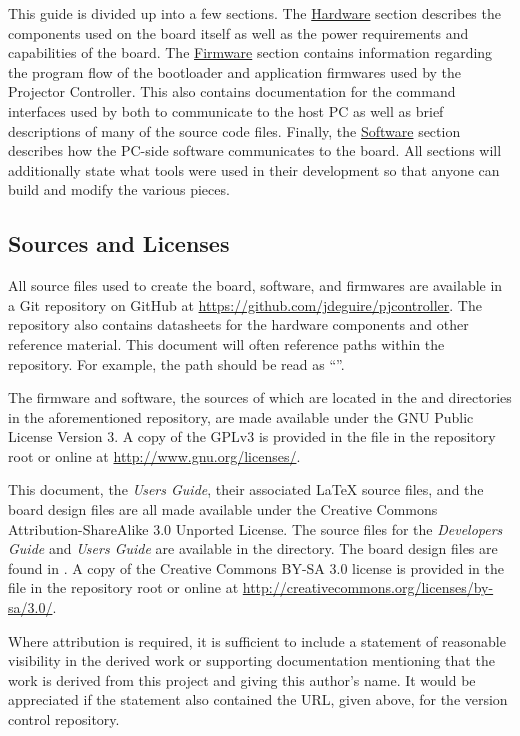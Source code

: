 \documentclass{article}
\begin{document}
This guide is divided up into a few sections.  The \hyperref[sec:Hardware]{Hardware} section
describes the components used on the board itself as well as the power requirements and capabilities
of the board.  The \hyperref[sec:Firmware]{Firmware} section contains information regarding the
program flow of the bootloader and application firmwares used by the Projector Controller.  This
also contains documentation for the command interfaces used by both to communicate to the host PC as
well as brief descriptions of many of the source code files.  Finally, the
\hyperref[sec:Software]{Software} section describes how the PC-side software communicates to the
board.  All sections will additionally state what tools were used in their development so that
anyone can build and modify the various pieces.

\subsection{Sources and Licenses} \label{ssec:SourceLic}
All source files used to create the board, software, and firmwares are available in a Git repository
on GitHub at \url{https://github.com/jdeguire/pjcontroller}.  The repository also contains
datasheets for the hardware components and other reference material.  This document will often
reference paths within the repository.  For example, the path  should
be read as ``''.

The firmware and software, the sources of which are located in the  and
 directories in the aforementioned repository, are made available under the GNU
Public License Version 3.  A copy of the GPLv3 is provided in the file  in the
repository root or online at \url{http://www.gnu.org/licenses/}.

This document, the \textit{Users Guide}, their associated \LaTeX{} source files, and the board
design files are all made available under the Creative Commons Attribution-ShareAlike 3.0 Unported
License.  The source files for the \textit{Developers Guide} and \textit{Users Guide} are available
in the  directory.  The board design files are found in
.  A copy of the Creative Commons BY-SA 3.0 license is provided in the
file  in the repository root or online at
\url{http://creativecommons.org/licenses/by-sa/3.0/}.

Where attribution is required, it is sufficient to include a statement of reasonable visibility in
the derived work or supporting documentation mentioning that the work is derived from this project
and giving this author's name.  It would be appreciated if the statement also contained the URL,
given above, for the version control repository.
\end{document}
